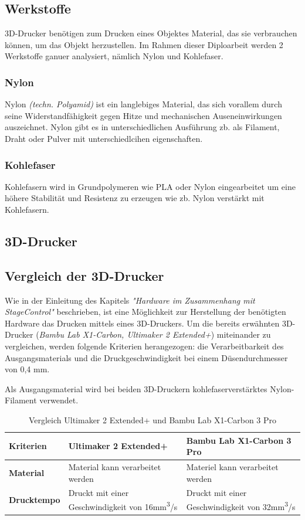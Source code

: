 \subsection{Werkstoffe}
3D-Drucker benötigen zum Drucken eines Objektes Material, das sie verbrauchen können, um das Objekt herzustellen. Im Rahmen dieser Diploarbeit werden 2 Werkstoffe ganuer analysiert, nämlich Nylon und Kohlefaser.

\subsubsection{Nylon}
Nylon \emph{(techn. Polyamid)} ist ein langlebiges Material, das sich vorallem durch seine Widerstandfähigkeit gegen Hitze und mechanischen Auseneinwirkungen auszeichnet. Nylon gibt es in unterschiedlichen Ausführung zb. als Filament, Draht oder Pulver mit unterschiedlcihen eigenschaften. \cite{Nylon}
\subsubsection{Kohlefaser}
Kohlefasern wird in Grundpolymeren wie PLA oder Nylon eingearbeitet um eine höhere Stabilität und Resistenz zu erzeugen wie zb. Nylon verstärkt mit Kohlefasern. \cite{Kohlefasern}


\subsection{3D-Drucker}

\subsection{Vergleich der 3D-Drucker}
Wie in der Einleitung des Kapitels \emph{"Hardware im Zusammenhang mit StageControl"} beschrieben, ist eine Möglichkeit zur Herstellung der benötigten Hardware das Drucken mittels eines 3D-Druckers. Um die bereits erwähnten 3D-Drucker (\emph{Bambu Lab X1-Carbon, Ultimaker 2 Extended+}) miteinander zu vergleichen, werden folgende Kriterien herangezogen: die Verarbeitbarkeit des Ausgangsmaterials und die Druckgeschwindigkeit bei einem Düsendurchmesser von 0,4 mm. 

Als Ausgangsmaterial wird bei beiden 3D-Druckern kohlefaserverstärktes Nylon-Filament verwendet.

\begin{table} [H]
	\begin{tabular}{ |p{2cm} |p{5cm}|p{5cm}| }
		\hline
		 \textbf{Kriterien} & \textbf{Ultimaker 2 Extended+}& \textbf{Bambu Lab X1-Carbon 3 Pro}\\
		\hline
		\textbf{Material} & Material kann verarbeitet werden & Materiel kann verarbeitet werden   \\ 
		\textbf{Drucktempo} & Druckt mit einer Geschwindigkeit von 16mm\textsuperscript{3}/s & Druckt mit einer Geschwindigkeit von 32mm\textsuperscript{3}/s   \\  
		\hline
	\end{tabular}
	\caption{Vergleich  Ultimaker 2 Extended+ und Bambu Lab X1-Carbon 3 Pro}
\end{table}


